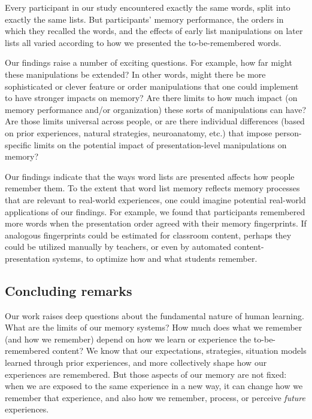 \documentclass[11pt]{article}
\begin{document}
Every participant in our study encountered exactly the same words, split into
exactly the same lists. But participants' memory performance, the orders in
which they recalled the words, and the effects of early list manipulations on
later lists all varied according to how we presented the to-be-remembered
words.

Our findings raise a number of exciting questions. For example, how far might
these manipulations be extended? In other words, might there be more
sophisticated or clever feature or order manipulations that one could implement
to have stronger impacts on memory? Are there limits to how much impact (on
memory performance and/or organization) these sorts of manipulations can have?
Are those limits universal across people, or are there individual differences
(based on prior experiences, natural strategies, neuroanatomy, etc.) that
impose person-specific limits on the potential impact of presentation-level
manipulations on memory?

Our findings indicate that the ways word lists are presented affects how people
remember them. To the extent that word list memory reflects memory processes
that are relevant to real-world experiences, one could imagine potential
real-world applications of our findings. For example, we found that
participants remembered more words when the presentation order agreed with
their memory fingerprints. If analogous fingerprints could be estimated for
classroom content, perhaps they could be utilized manually by teachers, or even
by automated content-presentation systems, to optimize how and what students
remember.



\subsection*{Concluding remarks}

Our work raises deep questions about the fundamental nature of human learning.
What are the limits of our memory systems? How much does what we remember (and
how we remember) depend on how we learn or experience the to-be-remembered
content? We know that our expectations, strategies, situation models learned
through prior experiences, and more collectively shape how our experiences are
remembered. But those aspects of our memory are not fixed: when we are exposed
to the same experience in a new way, it can change how we remember
that experience, and also how we remember, process, or perceive
\textit{future} experiences.
\end{document}
